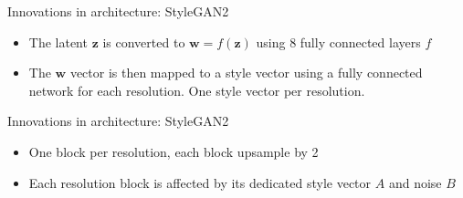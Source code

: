 \begin{frame}{Innovations in architecture: StyleGAN2}
\protect\hypertarget{innovations-in-architecture-stylegan2-1}{}

\begin{itemize}
\tightlist
\item
  The latent \(\boldsymbol{z}\) is converted to
  \(\boldsymbol{w} = f(\boldsymbol{z})\) using 8 fully connected layers
  \(f\)
\item
  The \(\boldsymbol{w}\) vector is then mapped to a style vector using a
  fully connected network for each resolution. One style vector per
  resolution.
\end{itemize}


\end{frame}

\begin{frame}{Innovations in architecture: StyleGAN2}
\protect\hypertarget{innovations-in-architecture-stylegan2-2}{}

\begin{itemize}
\tightlist
\item
  One block per resolution, each block upsample by 2
\item
  Each resolution block is affected by its dedicated style vector \(A\)
  and noise \(B\)
\end{itemize}


\end{frame}

